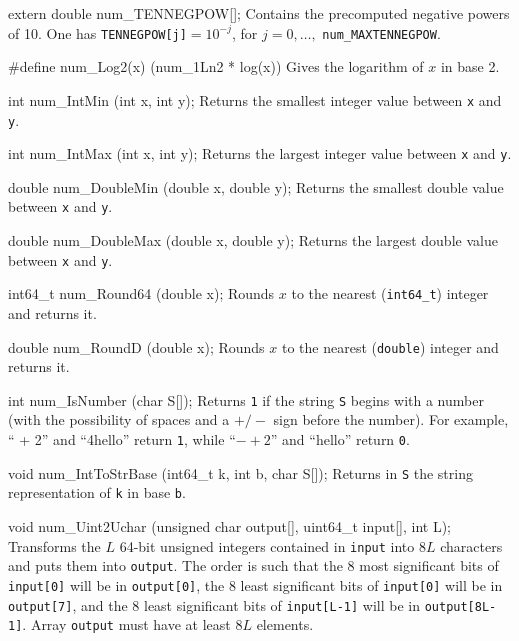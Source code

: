 {extern double num_TENNEGPOW[];
\endcode
 \tab Contains the precomputed negative powers of 10.
   One has {\tt TENNEGPOW[j]}$ = 10^{-j}$, for $j=0,\ldots,$
 {\tt num\_MAXTENNEGPOW}.
\endtab


\code

#define num_Log2(x) (num_1Ln2 * log(x))
\endcode
  \tab Gives the logarithm of $x$ in base 2.
  \endtab
\code

int num_IntMin (int x, int y);
\endcode
  \tab Returns the smallest integer value between {\tt x} and {\tt y}.
  \endtab
\code

int num_IntMax (int x, int y);
\endcode
  \tab Returns the largest integer value between {\tt x} and {\tt y}.
  \endtab
\code

double num_DoubleMin (double x, double y);
\endcode
  \tab Returns the smallest double value between {\tt x} and {\tt y}.
  \endtab
\code

double num_DoubleMax (double x, double y);
\endcode
  \tab Returns the largest double value between {\tt x} and {\tt y}.
  \endtab
\code

int64_t num_Round64 (double x);
\endcode
  \tab Rounds $x$ to the nearest ({\tt int64\_t}) integer and returns it.
  \endtab
\code

double num_RoundD (double x);
\endcode
  \tab Rounds $x$ to the nearest ({\tt double}) integer and returns it.
  \endtab
\code

int num_IsNumber (char S[]);
\endcode
\tab  Returns {\tt 1} if the string {\tt S} begins with a number
   (with the possibility of spaces and a $+/-$ sign
   before the number). For example, `` + 2'' and ``4hello''
   return {\tt 1}, while ``$-+2$'' and ``hello'' return  {\tt 0}.
\endtab
\code

void num_IntToStrBase (int64_t k, int b, char S[]);
\endcode
  \tab Returns in {\tt S} the string representation of {\tt k} in base {\tt b}.
  \endtab
\code

void num_Uint2Uchar (unsigned char output[], uint64_t input[], int L);
\endcode
  \tab Transforms the $L$ 64-bit unsigned integers contained in {\tt input} into
  $8L$ characters and puts them into {\tt output}. The order is such that
  the 8 most significant bits of {\tt input[0]} will be in {\tt output[0]},
  the 8 least significant bits of {\tt input[0]} will be in {\tt output[7]},
  and the 8 least significant bits of {\tt input[L-1]} will be in
  {\tt output[8L-1]}. Array {\tt output} must have at least $8L$ elements.
  \endtab
\code

}
